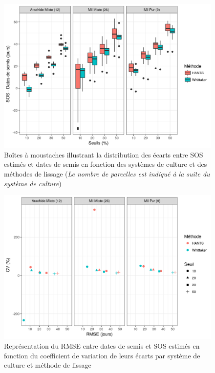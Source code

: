 \begin{figure}[htbp]
 \begin{center}
  \includegraphics[scale=0.7]{resultats_discussions/SOS_Boxplot.png} 
 \end{center}
 \caption[Distribution des écarts entre SOS et dates de semis]{Boîtes à moustaches illustrant la distribution des écarts entre SOS estimés et dates de semis en fonction des systèmes de culture et des méthodes de lissage (\emph{Le nombre de parcelles est indiqué à la suite du système de culture})}
 \label{fig-sosboxplot}
\end{figure}

\begin{figure}[htbp]
 \begin{center}
  \includegraphics[scale=0.7]{resultats_discussions/SOS_RMSE_vs_CV.png} 
 \end{center}
 \caption[SOS -- RMSE vs CV]{Représentation du RMSE entre dates de semis et SOS estimés en fonction du coefficient de variation de leurs écarts par système de culture et méthode de lissage}
 \label{fig-sos-rmse-cv}
\end{figure}

